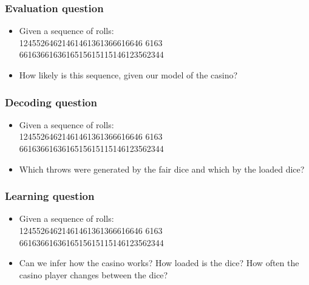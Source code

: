 \documentclass[usenames,dvipsnames]{beamer}
\newcommand{\voc}[1]{{\color{ForestGreen}#1}}
\begin{document}
 \begin{frame}
   \frametitle{\voc{Evaluation} question}
   \begin{itemize}
   \item Given a sequence of rolls:\\
     124552\alert{6}4\alert{6}214\alert{6}14\alert{6}13\alert{6}13\alert{6}\alert{6}\alert{6}1\alert{6}\alert{6}4\alert{6}
     \alert{6}1\alert{6}3\\\alert{6}\alert{6}1\alert{6}3\alert{6}\alert{6}1\alert{6}3\alert{6}1\alert{6}515\alert{6}1511514\alert{6}1235\alert{6}2344
  \item How likely is this sequence, given our model of the casino?
   \end{itemize}
 \end{frame}


 \begin{frame}
   \frametitle{\Large \voc{Decoding} question} 
   \begin{itemize}
   \item Given a sequence of rolls:\\
       124552\alert{6}4\alert{6}214\alert{6}14\alert{6}13\alert{6}13\alert{6}\alert{6}\alert{6}1\alert{6}\alert{6}4\alert{6}
       \alert{6}1\alert{6}3\\\alert{6}\alert{6}1\alert{6}3\alert{6}\alert{6}1\alert{6}3\alert{6}1\alert{6}515\alert{6}1511514\alert{6}1235\alert{6}2344
   \item Which throws were generated by the fair dice and which by the
     loaded dice?
   \end{itemize}
 \end{frame}


 \begin{frame}
   \frametitle{\voc{\large Learning} question}
   \begin{itemize}
   \item Given a sequence of rolls:\\
       124552\alert{6}4\alert{6}214\alert{6}14\alert{6}13\alert{6}13\alert{6}\alert{6}\alert{6}1\alert{6}\alert{6}4\alert{6}
       \alert{6}1\alert{6}3\\\alert{6}\alert{6}1\alert{6}3\alert{6}\alert{6}1\alert{6}3\alert{6}1\alert{6}515\alert{6}1511514\alert{6}1235\alert{6}2344
   \item Can we infer how the casino works? How loaded is the dice? How
     often the casino player changes between the dice?
\end{itemize}
 \end{frame}
\end{document}
